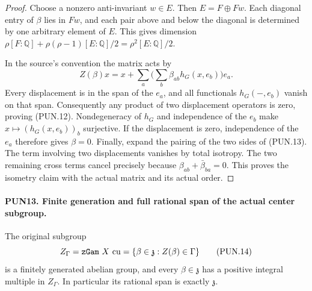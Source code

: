 \documentclass[11pt,a4paper]{article}
\numberwithin{equation}{section}
\theoremstyle{remark}\newtheorem{remark}[theorem]{Remark}
\begin{document}
\begin{proof}
Choose a nonzero anti-invariant \(w\in E\).  Then
\(E=F\oplus Fw\).  Each diagonal entry of \(\beta\) lies in
\(Fw\), and each pair above and below the diagonal is determined
by one arbitrary element of \(E\).  This gives dimension
\(\rho[F:\mathbb Q]+\rho(\rho-1)[E:\mathbb Q]/2
=\rho^2[E:\mathbb Q]/2\).

In the source's convention the matrix acts by
\[
 Z(\beta)x=x+\sum_a\Big(\sum_b\beta_{ab}h_G(x,e_b)\Big)e_a.
 \tag{PUN.13}
\]
Every displacement is in the span of the \(e_a\), and all
functionals \(h_G(-,e_b)\) vanish on that span.  Consequently
any product of two displacement operators is zero, proving
(PUN.12).  Nondegeneracy of \(h_G\) and independence of the
\(e_b\) make \(x\mapsto(h_G(x,e_b))_b\) surjective.
If the displacement is zero, independence of the \(e_a\)
therefore gives \(\beta=0\).  Finally, expand the pairing of
the two sides of (PUN.13).  The term involving two
displacements vanishes by total isotropy.  The two remaining
cross terms cancel precisely because
\(\beta_{ab}+\bar\beta_{ba}=0\).  This proves the isometry
claim with the actual matrix and its actual order.
\end{proof}

\paragraph{PUN13. Finite generation and full rational span of the actual center subgroup.}
\label{claim:PUN13}
The original subgroup
\[
 Z_\Gamma=\texttt{z\allowbreak Gam}\ X\ \mathrm{cu}
       =\{\beta\in\mathfrak z:Z(\beta)\in\Gamma\}
 \tag{PUN.14}
\]
is a finitely generated abelian group, and every
\(\beta\in\mathfrak z\) has a positive integral multiple in
\(Z_\Gamma\).  In particular its rational span is exactly
\(\mathfrak z\).
\end{document}
